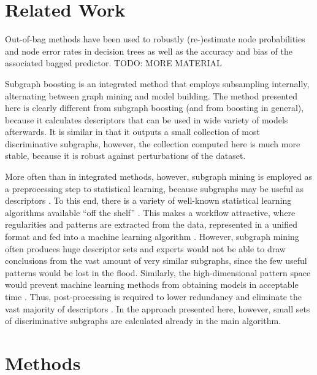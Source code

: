 \documentclass{article}
\begin{document}
\section{Related Work}
\label{s:relatedWork}

Out-of-bag methods have been used to robustly (re-)estimate node probabilities
and node error rates in decision trees \cite{breiman96oob} as well as the
accuracy \cite{bylander02estimating, breiman96oob} and bias
\cite{bylander02estimating} of the associated bagged predictor.
TODO: MORE MATERIAL

Subgraph boosting \cite{saigo09gboost} is an integrated method that employs
subsampling internally, alternating between graph mining and model building. The method presented here is
clearly different from subgraph boosting (and from boosting in general),
because it calculates descriptors that can be used in wide variety of models
afterwards. It is similar in that it outputs a small collection of most
discriminative subgraphs, however, the collection computed here is much more
stable, because it is robust against perturbations of the dataset.

More often than in integrated methods, however, subgraph mining is employed as
a preprocessing step to statistical learning, because subgraphs may be useful as
descriptors \cite{bringmann10lego,schietgat09mcsfeatures}. To this end, there
is a variety of well-known statistical learning algorithms available ``off the
shelf'' \cite{hall09weka,r08language}. This makes a workflow attractive, where
regularities and patterns are extracted from the data, represented in a unified
format and fed into a machine learning algorithm \cite{hkr03molfea}.  However,
subgraph mining often produces huge descriptor sets and experts would not be
able to draw conclusions from the vast amount of very similar subgraphs, since
the few useful patterns would be lost in the flood. Similarly, the
high-dimensional pattern space would prevent machine learning methods from
obtaining models in acceptable time \cite{Hasan_origami:mining}. Thus,
post-processing is required to lower redundancy and eliminate the vast majority
of descriptors \cite{schietgat09mcsfeatures, CMNK01Frequent, Jun04Spin}. In
the approach presented here, however, small sets of discriminative subgraphs are calculated
already in the main algorithm.



\section{Methods}
\end{document}
